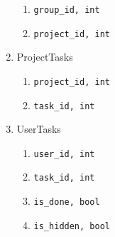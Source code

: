 \documentclass[12pt,a4paper,notitlepage]{article}
\begin{document}
\begin{enumerate}
    \begin{enumerate}
    \item \texttt{group\_id, int}
    \item \texttt{project\_id, int}
    \end{enumerate}
\item ProjectTasks
    \begin{enumerate}
    \item \texttt{project\_id, int}
    \item \texttt{task\_id, int}
    \end{enumerate}
\item UserTasks
    \begin{enumerate}
    \item \texttt{user\_id, int}
    \item \texttt{task\_id, int}
    \item \texttt{is\_done, bool}
    \item \texttt{is\_hidden, bool}
    \end{enumerate}
\end{enumerate}
\end{document}
